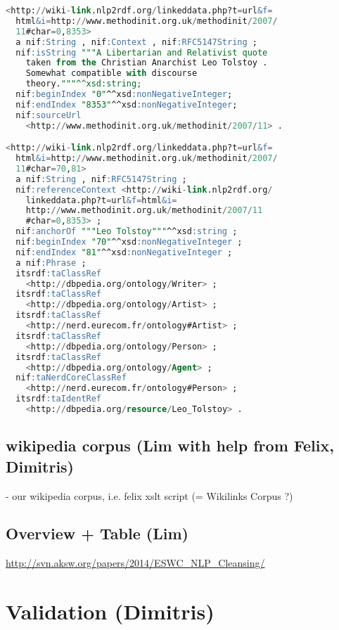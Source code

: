 \documentclass[10pt, a4paper]{article}
\begin{document}
\begin{lstlisting}[caption={A converted wikilinks item including one mention},label=lst:wikilinks,language={SQL}]
<http://wiki-link.nlp2rdf.org/linkeddata.php?t=url&f=
  html&i=http://www.methodinit.org.uk/methodinit/2007/
  11#char=0,8353>
  a nif:String , nif:Context , nif:RFC5147String ;
  nif:isString """A Libertarian and Relativist quote 
    taken from the Christian Anarchist Leo Tolstoy . 
    Somewhat compatible with discourse 
    theory."""^^xsd:string;
  nif:beginIndex "0"^^xsd:nonNegativeInteger;
  nif:endIndex "8353"^^xsd:nonNegativeInteger;
  nif:sourceUrl 
    <http://www.methodinit.org.uk/methodinit/2007/11> .

<http://wiki-link.nlp2rdf.org/linkeddata.php?t=url&f=
  html&i=http://www.methodinit.org.uk/methodinit/2007/
  11#char=70,81>
  a nif:String , nif:RFC5147String ;
  nif:referenceContext <http://wiki-link.nlp2rdf.org/
    linkeddata.php?t=url&f=html&i=
    http://www.methodinit.org.uk/methodinit/2007/11
    #char=0,8353> ;
  nif:anchorOf """Leo Tolstoy"""^^xsd:string ;
  nif:beginIndex "70"^^xsd:nonNegativeInteger ;
  nif:endIndex "81"^^xsd:nonNegativeInteger ;
  a nif:Phrase ;
  itsrdf:taClassRef  
    <http://dbpedia.org/ontology/Writer> ;
  itsrdf:taClassRef  
    <http://dbpedia.org/ontology/Artist> ;
  itsrdf:taClassRef  
    <http://nerd.eurecom.fr/ontology#Artist> ;
  itsrdf:taClassRef  
    <http://dbpedia.org/ontology/Person> ;
  itsrdf:taClassRef  
    <http://dbpedia.org/ontology/Agent> ;
  nif:taNerdCoreClassRef  
    <http://nerd.eurecom.fr/ontology#Person> ;
  itsrdf:taIdentRef  
    <http://dbpedia.org/resource/Leo_Tolstoy> .
\end{lstlisting}

\subsection{wikipedia corpus (Lim with help from Felix, Dimitris)}
- our wikipedia corpus, i.e. felix xslt script (= Wikilinks Corpus ?)\\


\subsection{Overview + Table (Lim)}
\url{http://svn.aksw.org/papers/2014/ESWC_NLP_Cleansing/}

 
\section{Validation (Dimitris)}
\end{document}
